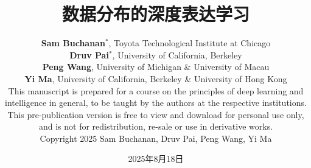\documentclass{book}
\begin{document}
 
\title{数据分布的深度表达学习 \vspace{0.1in}\\ 
}

\author{\vspace{0.5cm}
\textbf{Sam Buchanan}$^*$, Toyota Technological Institute at Chicago \vspace{3mm}\\
    \textbf{Druv Pai}$^*$, University of California, Berkeley \vspace{3mm} \\
    \textbf{Peng Wang}, University of Michigan \& 
    University of Macau  \vspace{3mm} \\
    \textbf{Yi Ma},   University of California, Berkeley \& University of Hong Kong
	\vspace{8cm}\\
	\footnotesize
	This manuscript is prepared for a course on the principles of deep learning
  and intelligence in general, to be taught by the authors at the respective
  institutions. This pre-publication version is free to view and download for
  personal use only, and is not for redistribution, re-sale or use in derivative
  works.\\  Copyright  2025 Sam Buchanan, Druv Pai, Peng Wang, Yi Ma
}

\date{\large 2025年8月18日}

\frontmatter
\titlepage
\thispagestyle{empty}
\maketitle

% 

% 


\cleardoublepage
\end{document}
